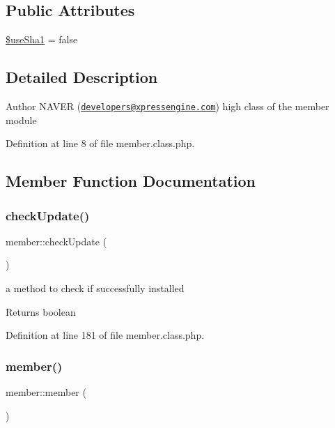 \subsection*{Public Attributes}
\begin{DoxyCompactItemize}
\item 
\hyperlink{classmember_ac0b029db59512728210f8b61dbab59f7}{\$use\+Sha1} = false
\end{DoxyCompactItemize}


\subsection{Detailed Description}
\begin{DoxyAuthor}{Author}
N\+A\+V\+ER (\href{mailto:developers@xpressengine.com}{\tt developers@xpressengine.\+com}) high class of the member module 
\end{DoxyAuthor}


Definition at line 8 of file member.\+class.\+php.



\subsection{Member Function Documentation}
\hypertarget{classmember_ad28f96bfab17efa94a9f2607a8b42a3d}{}\label{classmember_ad28f96bfab17efa94a9f2607a8b42a3d} 
\subsubsection{\texorpdfstring{check\+Update()}{checkUpdate()}}
{\footnotesize\ttfamily member\+::check\+Update (\begin{DoxyParamCaption}{ }\end{DoxyParamCaption})}

a method to check if successfully installed

\begin{DoxyReturn}{Returns}
boolean 
\end{DoxyReturn}


Definition at line 181 of file member.\+class.\+php.

\hypertarget{classmember_a4153f13605eac8adf8dde89ee7d18c02}{}\label{classmember_a4153f13605eac8adf8dde89ee7d18c02} 
\subsubsection{\texorpdfstring{member()}{member()}}
{\footnotesize\ttfamily member\+::member (\begin{DoxyParamCaption}{ }\end{DoxyParamCaption})}

